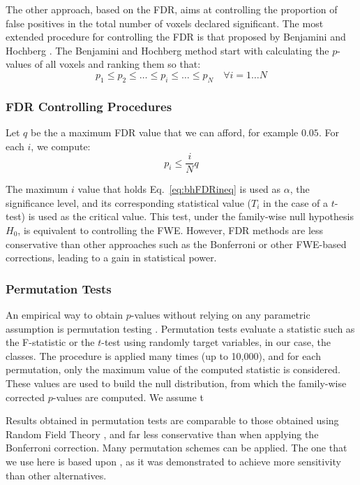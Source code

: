 The other approach, based on the \ac{FDR}, aims at controlling the proportion of false positives in the total number of voxels declared significant. The most extended procedure for controlling the \ac{FDR} is that proposed by Benjamini and Hochberg \cite{Benjamini1995}. The Benjamini and Hochberg method start with calculating the $p$-values of all voxels and ranking them so that:
\begin{equation}
p_1 \leq p_2 \leq \dots \leq p_i \leq \dots \leq p_N \quad \forall i=1\dots N
\end{equation}

\subsubsection{FDR Controlling Procedures}
Let $q$ be the a maximum \ac{FDR} value that we can afford, for example $0.05$. For each $i$, we compute:
\begin{equation}\label{eq:bhFDRineq}
p_i \leq \frac{i}{N}q
\end{equation}

The maximum $i$ value that holds Eq.~\ref{eq:bhFDRineq} is used as $\alpha$, the significance level, and its corresponding statistical value ($T_i$ in the case of a $t$-test) is used as the critical value. This test, under the family-wise null hypothesis $H_0$, is equivalent to controlling the \ac{FWE}. However, \ac{FDR} methods are less conservative than other approaches such as the Bonferroni or other \ac{FWE}-based corrections, leading to a gain in statistical power. 


\subsubsection{Permutation Tests}
An empirical way to obtain $p$-values without relying on any parametric assumption is permutation testing \cite{Anderson2001,Winkler2014}. Permutation tests evaluate a statistic such as the F-statistic or the $t$-test using randomly target variables, in our case, the classes. The procedure is applied many times (up to 10,000), and for each permutation, only the maximum value of the computed statistic is considered. These values are used to build the null distribution, from which the family-wise corrected $p$-values are computed. We assume t

Results obtained in permutation tests are comparable to those obtained using Random Field Theory \cite{Winkler2014}, and far less conservative than when applying the Bonferroni correction. Many permutation schemes can be applied. The one that we use here is based upon \cite{Anderson2001}, as it was demonstrated to achieve more sensitivity than other alternatives. 

